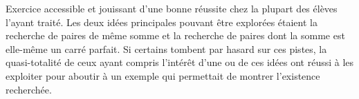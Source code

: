 Exercice accessible et jouissant d'une bonne réussite chez la plupart des élèves l'ayant traité. Les deux idées principales pouvant être explorées étaient la recherche de paires de même somme et la recherche de paires dont la somme est elle-même un carré parfait. Si certains tombent par hasard sur ces pistes, la quasi-totalité de ceux ayant compris l'intérêt d'une ou de ces idées ont réussi à les exploiter pour aboutir à un exemple qui permettait de montrer l'existence recherchée.